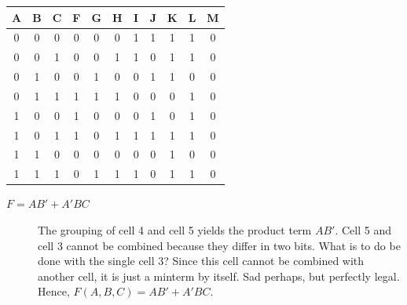 \begin{process:minimizationKmap}
\begin{tabular}{c|c|c||c|c|c|c|c|c|c|c}
A & B & C & F & G & H & I & J & K & L & M  \\ \hline
0 & 0 & 0 & 0 & 0 & 0 & 1 & 1 & 1 & 1 & 0  \\ \hline
0 & 0 & 1 & 0 & 0 & 1 & 1 & 0 & 1 & 1 & 0  \\ \hline
0 & 1 & 0 & 0 & 1 & 0 & 0 & 1 & 1 & 0 & 0  \\ \hline
0 & 1 & 1 & 1 & 1 & 1 & 0 & 0 & 0 & 1 & 0  \\ \hline
1 & 0 & 0 & 1 & 0 & 0 & 0 & 1 & 0 & 1 & 0  \\ \hline
1 & 0 & 1 & 1 & 0 & 1 & 1 & 1 & 1 & 1 & 0  \\ \hline
1 & 1 & 0 & 0 & 0 & 0 & 0 & 0 & 1 & 0 & 0  \\ \hline
1 & 1 & 1 & 0 & 1 & 1 & 1 & 0 & 1 & 1 & 0  
\end{tabular}

\begin{description}
\item [$F= AB' + A'BC$]
The grouping of cell 4 and cell 5 yields the product term $AB'$.  
Cell 5 and cell 3 cannot be combined because they differ in two bits.
What is to do be done with the single cell 3?  Since this cell 
cannot be combined
with another cell, it is just a minterm by itself.  Sad perhaps, 
but perfectly legal.  Hence, $F(A,B,C) = AB' + A'BC$.


\end{description}
\end{process:minimizationKmap}
